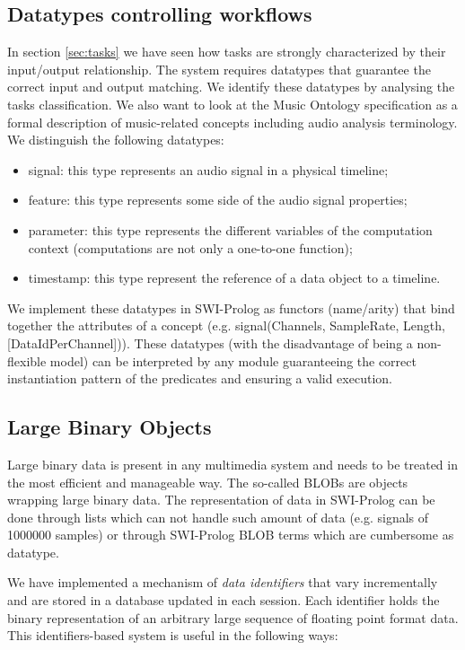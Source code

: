 \documentclass[runningheads]{llncs}
\begin{document}
\subsection{Datatypes controlling workflows}\label{subsec:datatypes}

In section \ref{sec:tasks} we have seen how tasks are strongly characterized by their input/output relationship. The system requires datatypes that guarantee the correct input and output matching. We identify these datatypes by analysing the tasks classification. We also want to look at the Music Ontology specification \cite{mo} as a formal description of music-related concepts including audio analysis terminology. We distinguish the following datatypes:

\begin{itemize}
 \item signal: this type represents an audio signal in a physical timeline;
 \item feature: this type represents some side of the audio signal properties;
 \item parameter: this type represents the different variables of the computation context (computations are not only a one-to-one function);
 \item timestamp: this type represent the reference of a data object to a timeline.
\end{itemize}

We implement these datatypes in SWI-Prolog as functors (name/arity) that bind together the attributes of a concept (e.g. signal(Channels, SampleRate, Length, [DataIdPerChannel])). These datatypes (with the disadvantage of being a non-flexible model) can be interpreted by any module guaranteeing the correct instantiation pattern of the predicates and ensuring a valid execution.

\subsection{Large Binary Objects}\label{subsec:blobs}

Large binary data is present in any multimedia system and needs to be treated in the most efficient and manageable way. The so-called BLOBs are objects wrapping large binary data. The representation of data in SWI-Prolog can be done through lists which can not handle such amount of data (e.g. signals of 1000000 samples) or through SWI-Prolog BLOB terms which are cumbersome as datatype.

We have implemented a mechanism of \textit{data identifiers} that vary incrementally and are stored in a database updated in each session. Each identifier holds the binary representation of an arbitrary large sequence of floating point format data. This identifiers-based system is useful in the following ways:
\end{document}
